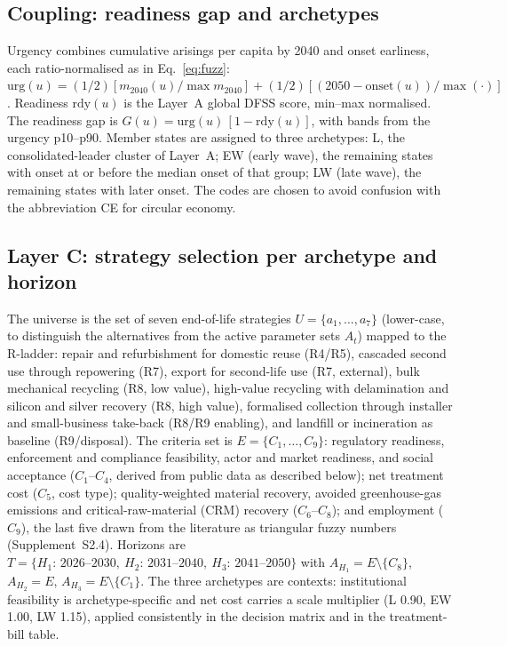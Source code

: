 \documentclass[a4paper,fleqn]{cas-sc}
\begin{document}
\subsection{Coupling: readiness gap and archetypes}\label{sec:coupling}
Urgency combines cumulative arisings per capita by 2040 and onset earliness, each ratio-normalised as in Eq.~\eqref{eq:fuzz}: $\mathrm{urg}(u)=(1/2)[m_{2040}(u)/\max m_{2040}]+(1/2)[(2050-\text{onset}(u))/\max(\cdot)]$. Readiness $\mathrm{rdy}(u)$ is the Layer~A global DFSS score, min--max normalised. The readiness gap is $G(u)=\mathrm{urg}(u)\,[1-\mathrm{rdy}(u)]$, with bands from the urgency p10--p90. Member states are assigned to three archetypes: L, the consolidated-leader cluster of Layer~A; EW (early wave), the remaining states with onset at or before the median onset of that group; LW (late wave), the remaining states with later onset. The codes are chosen to avoid confusion with the abbreviation CE for circular economy.

\subsection{Layer C: strategy selection per archetype and horizon}\label{sec:layerC}
The universe is the set of seven end-of-life strategies $U=\{a_1,\dots,a_7\}$ (lower-case, to distinguish the alternatives from the active parameter sets $A_t$) mapped to the R-ladder: repair and refurbishment for domestic reuse (R4/R5), cascaded second use through repowering (R7), export for second-life use (R7, external), bulk mechanical recycling (R8, low value), high-value recycling with delamination and silicon and silver recovery (R8, high value), formalised collection through installer and small-business take-back (R8/R9 enabling), and landfill or incineration as baseline (R9/disposal). The criteria set is $E=\{C_1,\dots,C_9\}$: regulatory readiness, enforcement and compliance feasibility, actor and market readiness, and social acceptance ($C_1$--$C_4$, derived from public data as described below); net treatment cost ($C_5$, cost type); quality-weighted material recovery, avoided greenhouse-gas emissions and critical-raw-material (CRM) recovery ($C_6$--$C_8$); and employment ($C_9$), the last five drawn from the literature \citep{irena2016,latunussa2016,deng2019,ansanelli2021,tsanakas2020,cucchiella2015} as triangular fuzzy numbers (Supplement~S2.4). Horizons are $T=\{H_1{:}\,2026\text{--}2030,\ H_2{:}\,2031\text{--}2040,\ H_3{:}\,2041\text{--}2050\}$ with $A_{H_1}=E\setminus\{C_8\}$, $A_{H_2}=E$, $A_{H_3}=E\setminus\{C_1\}$. The three archetypes are contexts: institutional feasibility is archetype-specific and net cost carries a scale multiplier (L 0.90, EW 1.00, LW 1.15), applied consistently in the decision matrix and in the treatment-bill table.
\end{document}
